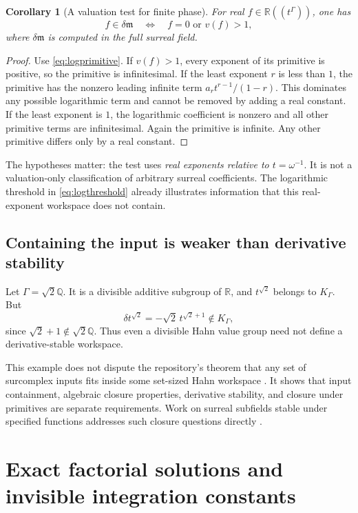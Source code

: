 \documentclass[11pt,letterpaper]{article}
\numberwithin{equation}{section}
\newtheorem{corollary}[theorem]{Corollary}
\theoremstyle{definition}
\theoremstyle{remark}
\newcommand{\R}{\mathbb R}
\newcommand{\Q}{\mathbb Q}
\newcommand{\mm}{\mathfrak m}
\begin{document}
\begin{corollary}[A valuation test for finite phase]\label{cor:valphase}
For real $f\in\R((t^\Gamma))$, one has
\[
 f\in\delta\mm
 \quad\Longleftrightarrow\quad
 f=0\text{ or }v(f)>1,
\]
where $\delta\mm$ is computed in the full surreal field.
\end{corollary}
\begin{proof}
Use \eqref{eq:logprimitive}. If $v(f)>1$, every exponent of its primitive is positive, so the primitive is infinitesimal. If the least exponent $r$ is less than $1$, the primitive has the nonzero leading infinite term $a_r t^{r-1}/(1-r)$. This dominates any possible logarithmic term and cannot be removed by adding a real constant. If the least exponent is $1$, the logarithmic coefficient is nonzero and all other primitive terms are infinitesimal. Again the primitive is infinite. Any other primitive differs only by a real constant.
\end{proof}
The hypotheses matter: the test uses \emph{real exponents relative to $t=\omega^{-1}$}. It is not a valuation-only classification of arbitrary surreal coefficients. The logarithmic threshold in \eqref{eq:logthreshold} already illustrates information that this real-exponent workspace does not contain.

\subsection{Containing the input is weaker than derivative stability}
Let $\Gamma=\sqrt2\Q$. It is a divisible additive subgroup of $\R$, and $t^{\sqrt2}$ belongs to $K_\Gamma$. But
\[
 \delta t^{\sqrt2}=-\sqrt2\,t^{\sqrt2+1}\notin K_\Gamma,
\]
since $\sqrt2+1\notin\sqrt2\Q$. Thus even a divisible Hahn value group need not define a derivative-stable workspace.

This example does not dispute the repository's theorem that any set of surcomplex inputs fits inside some set-sized Hahn workspace \cite{RepoFound}. It shows that input containment, algebraic closure properties, derivative stability, and closure under primitives are separate requirements. Work on surreal subfields stable under specified functions addresses such closure questions directly \cite{BG}.

\section{Exact factorial solutions and invisible integration constants}\label{sec:factorial}
\end{document}
